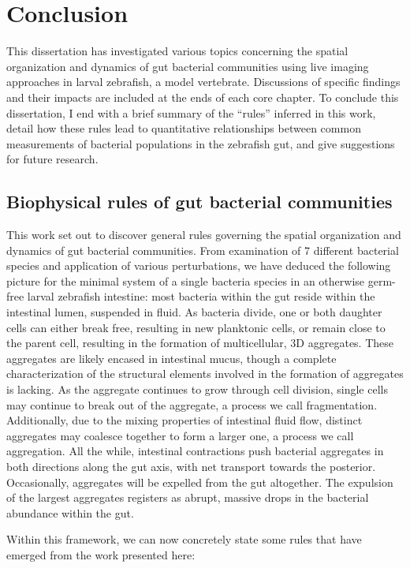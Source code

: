 \chapter{Conclusion}

This dissertation has investigated various topics concerning the spatial organization and dynamics of gut bacterial communities using live imaging approaches in larval zebrafish, a model vertebrate. Discussions of specific findings and their impacts are included at the ends of each core chapter. To conclude this dissertation, I end with a brief summary of the ``rules'' inferred in this work, detail how these rules lead to quantitative relationships between common measurements of bacterial populations in the zebrafish gut, and give suggestions for future research.

\section{Biophysical rules of gut bacterial communities}
This work set out to discover general rules governing the spatial organization and dynamics of gut bacterial communities. From examination of 7 different bacterial species and application of various perturbations, we have deduced the following picture for the minimal system of a single bacteria species in an otherwise germ-free larval zebrafish intestine: most bacteria within the gut reside within the intestinal lumen, suspended in fluid. As bacteria divide, one or both daughter cells can either break free, resulting in new planktonic cells, or remain close to the parent cell, resulting in the formation of multicellular, 3D aggregates. These aggregates are likely encased in intestinal mucus, though a complete characterization of the structural elements involved in the formation of aggregates is lacking. As the aggregate continues to grow through cell division, single cells may continue to break out of the aggregate, a process we call fragmentation. Additionally, due to the mixing properties of intestinal fluid flow, distinct aggregates may coalesce together to form a larger one, a process we call aggregation. All the while, intestinal contractions push bacterial aggregates in both directions along  the gut axis, with net transport towards the posterior. Occasionally, aggregates will be expelled from the gut altogether. The expulsion of the largest aggregates registers as abrupt, massive drops in the bacterial abundance within the gut. 

Within this framework, we can now concretely state some rules that have emerged from the work presented here:

